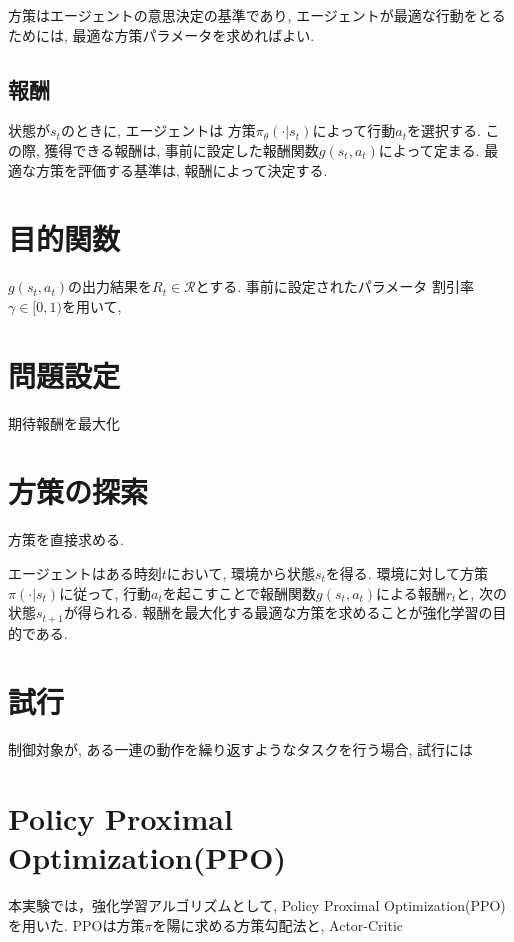 \documentclass[../main]{subfiles}
\begin{document}
方策はエージェントの意思決定の基準であり, 
エージェントが最適な行動をとるためには, 
最適な方策パラメータを求めればよい.


\subsection{報酬}
状態が$s_t$のときに, エージェントは
方策$\pi_\theta(\cdot|s_t)$によって行動$a_t$を選択する.
この際, 獲得できる報酬は, 
事前に設定した報酬関数$g(s_t, a_t)$によって定まる. 
最適な方策を評価する基準は, 報酬によって決定する.


\section{目的関数}
$g(s_t, a_t)$の出力結果を$R_t \in \mathcal{R}$とする.
事前に設定されたパラメータ
割引率$\gamma \in [0, 1)$を用いて, 

\section{問題設定}
期待報酬を最大化

\section{方策の探索}
方策を直接求める.

エージェントはある時刻$t$において, 環境から状態$s_t$を得る.
環境に対して方策$\pi(\cdot|s_t)$に従って, 
行動$a_t$を起こすことで報酬関数$g(s_t,a_t)$による報酬$r_t$と, 
次の状態$s_{t+1}$が得られる. 
報酬を最大化する最適な方策を求めることが強化学習の目的である.


\section{試行}
制御対象が, ある一連の動作を繰り返すようなタスクを行う場合, 
試行には


\section{Policy Proximal Optimization(PPO)}
本実験では，強化学習アルゴリズムとして, 
Policy Proximal Optimization(PPO)
\cite{ref:proximal_policy}を用いた.
PPOは方策$\pi$を陽に求める方策勾配法と, Actor-Critic
\end{document}
